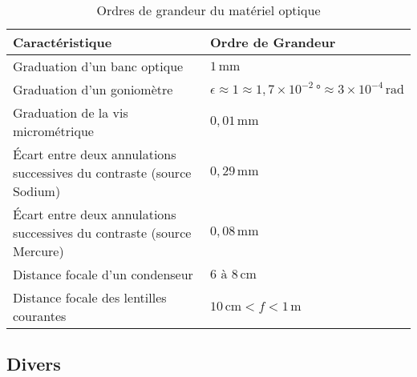 \documentclass[10pt]{article}
\begin{document}
\begin{multicols}{2}
\begin{table}[H]
\centering
\caption{Ordres de grandeur du matériel optique}
\begin{tabular}{|p{5cm}|p{5cm}|}
\hline
\textbf{Caractéristique} & \textbf{Ordre de Grandeur} \\ \hline
Graduation d’un banc optique & \(1\,\text{mm}\) \\ \hline
Graduation d’un goniomètre & \(\epsilon \approx 1 \approx 1,7 \times 10^{-2}\,\text{°} \approx 3 \times 10^{-4}\,\text{rad}\) \\ \hline
Graduation de la vis micrométrique & \(0,01\,\text{mm}\) \\ \hline
Écart entre deux annulations successives du contraste (source Sodium) & \(0,29\,\text{mm}\) \\ \hline
Écart entre deux annulations successives du contraste (source Mercure) & \(0,08\,\text{mm}\) \\ \hline
Distance focale d’un condenseur & \(6 \text{ à } 8\,\text{cm}\) \\ \hline
Distance focale des lentilles courantes & \(10\,\text{cm} < f < 1\,\text{m}\) \\ \hline
\end{tabular}
\end{table}

\subsection{Divers}


\end{multicols}
\end{document}
